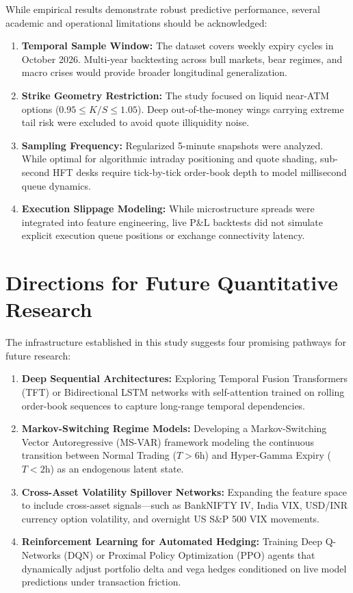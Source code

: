While empirical results demonstrate robust predictive performance, several academic and operational limitations should be acknowledged:
\begin{enumerate}\setlength{\itemsep}{0pt}\setlength{\parskip}{0pt}
    \item \textbf{Temporal Sample Window:} The dataset covers weekly expiry cycles in October 2026. Multi-year backtesting across bull markets, bear regimes, and macro crises would provide broader longitudinal generalization.
    \item \textbf{Strike Geometry Restriction:} The study focused on liquid near-ATM options ($0.95 \le K/S \le 1.05$). Deep out-of-the-money wings carrying extreme tail risk were excluded to avoid quote illiquidity noise.
    \item \textbf{Sampling Frequency:} Regularized 5-minute snapshots were analyzed. While optimal for algorithmic intraday positioning and quote shading, sub-second HFT desks require tick-by-tick order-book depth to model millisecond queue dynamics.
    \item \textbf{Execution Slippage Modeling:} While microstructure spreads were integrated into feature engineering, live P\&L backtests did not simulate explicit execution queue positions or exchange connectivity latency.
\end{enumerate}

\section{Directions for Future Quantitative Research}
\label{sec:future_research}

The infrastructure established in this study suggests four promising pathways for future research:
\begin{enumerate}\setlength{\itemsep}{0pt}\setlength{\parskip}{0pt}
    \item \textbf{Deep Sequential Architectures:} Exploring Temporal Fusion Transformers (TFT) or Bidirectional LSTM networks with self-attention trained on rolling order-book sequences to capture long-range temporal dependencies.
    \item \textbf{Markov-Switching Regime Models:} Developing a Markov-Switching Vector Autoregressive (MS-VAR) framework modeling the continuous transition between Normal Trading ($T > 6\text{h}$) and Hyper-Gamma Expiry ($T < 2\text{h}$) as an endogenous latent state.
    \item \textbf{Cross-Asset Volatility Spillover Networks:} Expanding the feature space to include cross-asset signals—such as BankNIFTY IV, India VIX, USD/INR currency option volatility, and overnight US S\&P 500 VIX movements.
    \item \textbf{Reinforcement Learning for Automated Hedging:} Training Deep Q-Networks (DQN) or Proximal Policy Optimization (PPO) agents that dynamically adjust portfolio delta and vega hedges conditioned on live model predictions under transaction friction.
\end{enumerate}
